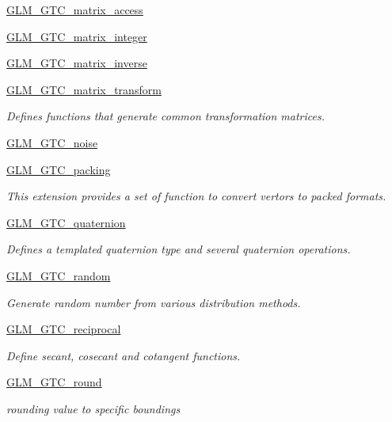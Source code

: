 \begin{DoxyCompactItemize}
\hyperlink{group__gtc__matrix__access}{G\-L\-M\-\_\-\-G\-T\-C\-\_\-matrix\-\_\-access}
\item 
\hyperlink{group__gtc__matrix__integer}{G\-L\-M\-\_\-\-G\-T\-C\-\_\-matrix\-\_\-integer}
\item 
\hyperlink{group__gtc__matrix__inverse}{G\-L\-M\-\_\-\-G\-T\-C\-\_\-matrix\-\_\-inverse}
\item 
\hyperlink{group__gtc__matrix__transform}{G\-L\-M\-\_\-\-G\-T\-C\-\_\-matrix\-\_\-transform}
\begin{DoxyCompactList}\small\item\em Defines functions that generate common transformation matrices. \end{DoxyCompactList}\item 
\hyperlink{group__gtc__noise}{G\-L\-M\-\_\-\-G\-T\-C\-\_\-noise}
\item 
\hyperlink{group__gtc__packing}{G\-L\-M\-\_\-\-G\-T\-C\-\_\-packing}
\begin{DoxyCompactList}\small\item\em This extension provides a set of function to convert vertors to packed formats. \end{DoxyCompactList}\item 
\hyperlink{group__gtc__quaternion}{G\-L\-M\-\_\-\-G\-T\-C\-\_\-quaternion}
\begin{DoxyCompactList}\small\item\em Defines a templated quaternion type and several quaternion operations. \end{DoxyCompactList}\item 
\hyperlink{group__gtc__random}{G\-L\-M\-\_\-\-G\-T\-C\-\_\-random}
\begin{DoxyCompactList}\small\item\em Generate random number from various distribution methods. \end{DoxyCompactList}\item 
\hyperlink{group__gtc__reciprocal}{G\-L\-M\-\_\-\-G\-T\-C\-\_\-reciprocal}
\begin{DoxyCompactList}\small\item\em Define secant, cosecant and cotangent functions. \end{DoxyCompactList}\item 
\hyperlink{group__gtc__round}{G\-L\-M\-\_\-\-G\-T\-C\-\_\-round}
\begin{DoxyCompactList}\small\item\em rounding value to specific boundings \end{DoxyCompactList}\item 

\end{DoxyCompactItemize}
